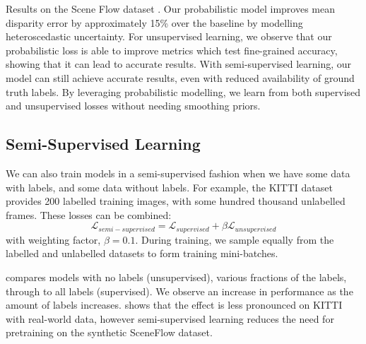 \begin{table}[t]
\caption[Results on the Scene Flow dataset with uncertainty and unsupervised learning.]{Results on the Scene Flow dataset \citep{MIFDB16}. Our probabilistic model improves mean disparity error by approximately 15\% over the baseline by modelling heteroscedastic uncertainty. For unsupervised learning, we observe that our probabilistic loss is able to improve metrics which test fine-grained accuracy, showing that it can lead to accurate results. With semi-supervised learning, our model can still achieve accurate results, even with reduced availability of ground truth labels. By leveraging probabilistic modelling, we learn from both supervised and unsupervised losses without needing smoothing priors.}
\label{tbl:scene_flow2}
\end{table}

\subsection{Semi-Supervised Learning}

We can also train models in a semi-supervised fashion when we have some data with labels, and some data without labels. For example, the KITTI dataset provides 200 labelled training images, with some hundred thousand unlabelled frames. These losses can be combined:
\begin{equation}
\mathcal{L}_{semi-supervised} = \mathcal{L}_{supervised} + \beta \mathcal{L}_{unsupervised}
\label{eqn:semi_supervised}
\end{equation}
with weighting factor, $\beta=0.1$. During training, we sample equally from the labelled and unlabelled datasets to form training mini-batches. 

 compares models with no labels (unsupervised), various fractions of the labels, through to all labels (supervised). We observe an increase in performance as the amount of labels increases.  shows that the effect is less pronounced on KITTI with real-world data, however semi-supervised learning reduces the need for pretraining on the synthetic SceneFlow dataset.

